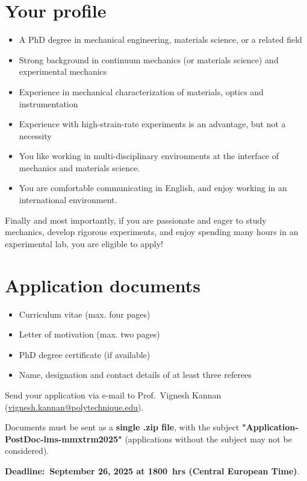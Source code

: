 \documentclass[a4paper,11pt,fleqn]{article}
\begin{document}
	\section*{Your profile}
	\begin{itemize}[leftmargin=*]
		\itemsep-0.10em
		\item A PhD degree in mechanical engineering, materials science, or a related field
		\item Strong background in continuum mechanics (or materials science) and experimental mechanics
		\item Experience in mechanical characterization of materials, optics and instrumentation
		\item Experience with high-strain-rate experiments is an advantage, but not a necessity
		\item You like working in multi-disciplinary environments at the interface of mechanics and materials science.
		\item You are comfortable communicating in English, and enjoy working in an international environment.
	\end{itemize}
	\vspace{-1em}
	Finally and most importantly, if you are passionate and eager to study mechanics, develop rigorous experiments, and enjoy spending many hours in an experimental lab, you are eligible to apply!

	\section*{Application documents}
	\begin{itemize}[leftmargin=*]
		\itemsep-0.10em
		\item Curriculum vitae (max. four pages)
		\item Letter of motivation (max. two pages)
		\item  PhD degree certificate (if available)
		\item Name, designation and contact details of at least three referees
	\end{itemize}
	\begin{center}
		\vspace*{0em}
		{Send your application} via e-mail to {Prof.~Vignesh Kannan} (\href{mailto:vignesh.kannan@polytechnique.edu}{vignesh.kannan@polytechnique.edu}).
		
		Documents must be sent as a \textbf{single .zip file}, with the subject \textbf{"Application-PostDoc-lms-mmxtrm2025"} (applications without the subject may not be considered). 
		
		\textbf{Deadline:~September 26, 2025 at 1800~hrs (Central European Time)}. 
	\end{center}
\end{document}
